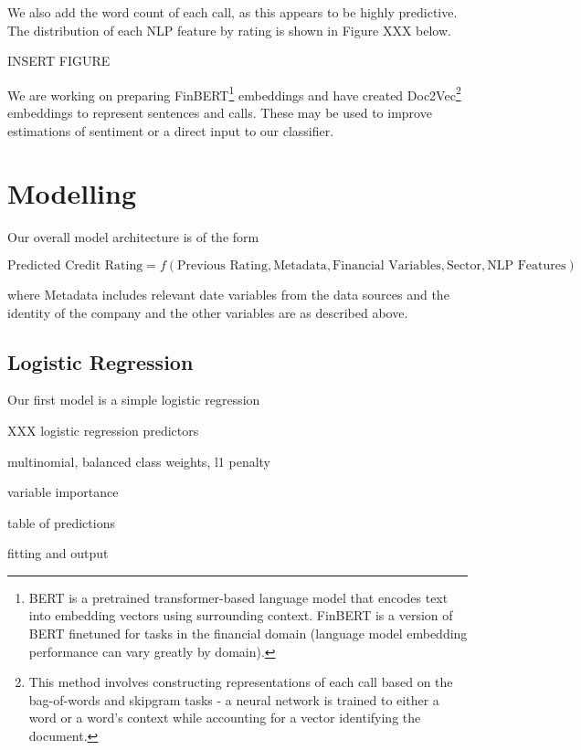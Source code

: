\documentclass{article}[11pt]
\begin{document}
    We also add the word count of each call, as this appears to be highly predictive. The distribution of each NLP feature by rating is shown in Figure XXX below.

    INSERT FIGURE

    We are working on preparing FinBERT\footnote{BERT is a pretrained transformer-based language model that encodes text into embedding vectors using surrounding context. FinBERT is a version of BERT finetuned for tasks in the financial domain (language model embedding performance can vary greatly by domain).} \citep{araci_finbert_2019} embeddings and have created Doc2Vec\footnote{This method involves constructing representations of each call based on the bag-of-words and skipgram tasks - a neural network is trained to either a word or a word's context while accounting for a vector identifying the document.} \citep{le_distributed_2014} embeddings to represent sentences and calls. These may be used to improve estimations of sentiment or a direct input to our classifier.

    \section*{Modelling}

    Our overall model architecture is of the form

    \begin{equation*}
        \text{Predicted Credit Rating} = f(\text{Previous Rating}, \text{Metadata}, \text{Financial Variables}, \text{Sector}, \text{NLP Features})
    \end{equation*}

    where Metadata includes relevant date variables from the data sources and the identity of the company and the other variables are as described above.

    \subsection*{Logistic Regression}

    Our first model is a simple logistic regression

    XXX logistic regression predictors

    multinomial, balanced class weights, l1 penalty

    variable importance

    table of predictions

    fitting and output
\end{document}
